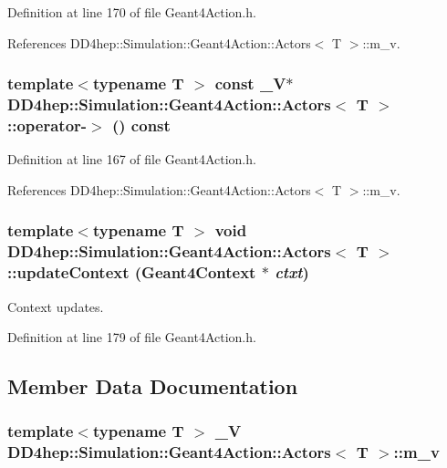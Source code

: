 Definition at line 170 of file Geant4Action.h.

References DD4hep::Simulation::Geant4Action::Actors$<$ T $>$::m\_\-v.\hypertarget{class_d_d4hep_1_1_simulation_1_1_geant4_action_1_1_actors_ab3f3e4e31d4e16ccb556950bc758e625}{
\subsubsection[{operator-\/$>$}]{\setlength{\rightskip}{0pt plus 5cm}template$<$typename T $>$ const {\bf \_\-V}$\ast$ {\bf DD4hep::Simulation::Geant4Action::Actors}$<$ {\bf T} $>$::operator-\/$>$ () const}}
\label{class_d_d4hep_1_1_simulation_1_1_geant4_action_1_1_actors_ab3f3e4e31d4e16ccb556950bc758e625}


Definition at line 167 of file Geant4Action.h.

References DD4hep::Simulation::Geant4Action::Actors$<$ T $>$::m\_\-v.\hypertarget{class_d_d4hep_1_1_simulation_1_1_geant4_action_1_1_actors_aadb2c770ac471bc278d2fc9a1cc719d3}{
\subsubsection[{updateContext}]{\setlength{\rightskip}{0pt plus 5cm}template$<$typename T $>$ void {\bf DD4hep::Simulation::Geant4Action::Actors}$<$ {\bf T} $>$::updateContext ({\bf Geant4Context} $\ast$ {\em ctxt})}}
\label{class_d_d4hep_1_1_simulation_1_1_geant4_action_1_1_actors_aadb2c770ac471bc278d2fc9a1cc719d3}


Context updates. 

Definition at line 179 of file Geant4Action.h.

\subsection{Member Data Documentation}
\hypertarget{class_d_d4hep_1_1_simulation_1_1_geant4_action_1_1_actors_a9b46bb7156ab383291efa066fc23ce7d}{
\subsubsection[{m\_\-v}]{\setlength{\rightskip}{0pt plus 5cm}template$<$typename T $>$ {\bf \_\-V} {\bf DD4hep::Simulation::Geant4Action::Actors}$<$ {\bf T} $>$::{\bf m\_\-v}}}
\label{class_d_d4hep_1_1_simulation_1_1_geant4_action_1_1_actors_a9b46bb7156ab383291efa066fc23ce7d}


